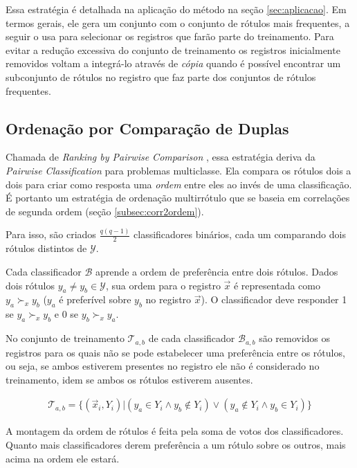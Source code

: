 \documentclass[runningheads,a4paper]{llncs}
\begin{document}
Essa estratégia é detalhada na aplicação do método na seção \ref{sec:aplicacao}. Em termos gerais, ele gera um conjunto com o conjunto de rótulos mais frequentes, a seguir o usa para selecionar os registros que farão parte do treinamento. Para evitar a redução excessiva do conjunto de treinamento os registros inicialmente removidos voltam a integrá-lo através de \textit{cópia} quando é possível encontrar um subconjunto de rótulos no registro que faz parte dos conjuntos de rótulos frequentes.


\subsection{Ordenação por Comparação de Duplas} \label{subsec:comparacaoduplas}

Chamada de \textit{Ranking by Pairwise Comparison} \cite{Hullermeier2008-co}, essa estratégia deriva da \textit{Pairwise Classification} para problemas multiclasse. Ela compara os rótulos dois a dois para criar como resposta uma \textit{ordem} entre eles ao invés de uma classificação. É portanto um estratégia de ordenação multirrótulo que se baseia em correlações de segunda ordem (seção \ref{subsec:corr2ordem}).

Para isso, são criados $\frac{q(q - 1)}{2}$ classificadores binários, cada um comparando dois rótulos distintos de $\mathcal{Y}$.

Cada classificador $\mathcal{B}$ aprende a ordem de preferência entre dois rótulos. Dados dois rótulos $y_a \neq y_b \in \mathcal{Y}$, sua ordem para o registro $\vec{x}$ é representada como $y_a \succ_x y_b$ ($y_a$ é preferível sobre $y_b$ no registro $\vec{x}$). O classificador deve responder 1 se $y_a \succ_x y_b$ e 0 se $y_b \succ_x y_a$.

No conjunto de treinamento $\mathcal{T}_{a,b}$ de cada classificador $\mathcal{B}_{a,b}$ são removidos os registros para os quais não se pode estabelecer uma preferência entre os rótulos, ou seja, se ambos estiverem presentes no registro ele não é considerado no treinamento, idem se ambos os rótulos estiverem ausentes.

\begin{align*}
	\mathcal{T}_{a,b} = \{(\vec{x}_i, Y_i) | (y_a \in Y_i \wedge y_b \notin Y_i) \vee (y_a \notin Y_i \wedge y_b \in Y_i)\}
\end{align*}

A montagem da ordem de rótulos é feita pela soma de votos dos classificadores. Quanto mais classificadores derem preferência a um rótulo sobre os outros, mais acima na ordem ele estará.
\end{document}
